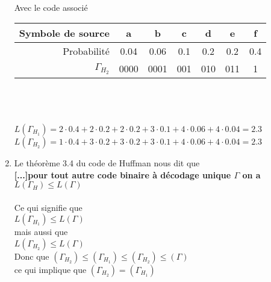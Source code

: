 \documentclass[10pt,a4paper]{article}
\begin{document}
\begin{enumerate}
\begin{center}
\\
\end{center}
Avec le code associé \\
\begin{tabular}{r|c|c|c|c|c|c}
Symbole de source & a & b & c & d & e & f\\
\hline
Probabilité& 0.04 & 0.06 & 0.1 & 0.2 & 0.2 & 0.4\\
\hline
$\Gamma_{H_2}$& 0000 & 0001 & 001 & 010 & 011 & 1 
\end{tabular}\\
\\
\\
$L(\Gamma_{H_1}) = 2\cdot0.4 + 2\cdot0.2 + 2\cdot 0.2 + 3\cdot 0.1 + 4\cdot 0.06 + 4\cdot 0.04 = 2.3$\\
$L(\Gamma_{H_2}) = 1\cdot0.4 + 3\cdot0.2 + 3\cdot 0.2 + 3\cdot 0.1 + 4\cdot 0.06 + 4\cdot 0.04 = 2.3$
\item Le théorème 3.4 du code de Huffman nous dit que \\
\textbf{[...]pour tout autre code binaire à décodage unique $\Gamma$ on a \\
$L(\Gamma_H) \leq L(\Gamma)$}\\
\\
Ce qui signifie que \\
$L(\Gamma_{H_1}) \leq L(\Gamma)$\\
mais aussi que \\
$L(\Gamma_{H_2}) \leq L(\Gamma)$\\
Donc que $(\Gamma_{H_2}) \leq (\Gamma_{H_1}) \leq (\Gamma_{H_2}) \leq (\Gamma)$\\
ce qui implique que $(\Gamma_{H_2}) = (\Gamma_{H_1})$	
\end{enumerate}
\end{document}
